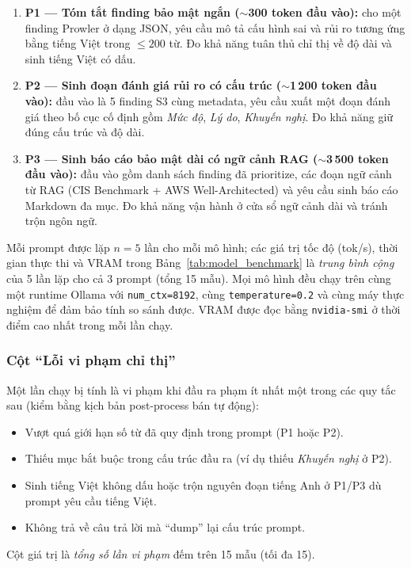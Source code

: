 \begin{enumerate}
  \item \textbf{P1 --- Tóm tắt finding bảo mật ngắn ($\sim$300 token đầu vào):} cho một finding Prowler ở dạng JSON, yêu cầu mô tả cấu hình sai và rủi ro tương ứng bằng tiếng Việt trong $\le 200$ từ. Đo khả năng tuân thủ chỉ thị về độ dài và sinh tiếng Việt có dấu.
  \item \textbf{P2 --- Sinh đoạn đánh giá rủi ro có cấu trúc ($\sim$1\,200 token đầu vào):} đầu vào là 5 finding S3 cùng metadata, yêu cầu xuất một đoạn đánh giá theo bố cục cố định gồm \textit{Mức độ}, \textit{Lý do}, \textit{Khuyến nghị}. Đo khả năng giữ đúng cấu trúc và độ dài.
  \item \textbf{P3 --- Sinh báo cáo bảo mật dài có ngữ cảnh RAG ($\sim$3\,500 token đầu vào):} đầu vào gồm danh sách finding đã prioritize, các đoạn ngữ cảnh từ RAG (CIS Benchmark + AWS Well-Architected) và yêu cầu sinh báo cáo Markdown đa mục. Đo khả năng vận hành ở cửa sổ ngữ cảnh dài và tránh trộn ngôn ngữ.
\end{enumerate}

Mỗi prompt được lặp $n=5$ lần cho mỗi mô hình; các giá trị tốc độ (tok/s), thời gian thực thi và VRAM trong Bảng~\ref{tab:model_benchmark} là \textit{trung bình cộng} của 5 lần lặp cho cả 3 prompt (tổng 15 mẫu). Mọi mô hình đều chạy trên cùng một runtime Ollama với \texttt{num\_ctx=8192}, cùng \texttt{temperature=0.2} và cùng máy thực nghiệm để đảm bảo tính so sánh được. VRAM được đọc bằng \texttt{nvidia-smi} ở thời điểm cao nhất trong mỗi lần chạy.

\subsubsection*{Cột ``Lỗi vi phạm chỉ thị''}
Một lần chạy bị tính là vi phạm khi đầu ra phạm ít nhất một trong các quy tắc sau (kiểm bằng kịch bản post-process bán tự động):
\begin{itemize}
  \item Vượt quá giới hạn số từ đã quy định trong prompt (P1 hoặc P2).
  \item Thiếu mục bắt buộc trong cấu trúc đầu ra (ví dụ thiếu \textit{Khuyến nghị} ở P2).
  \item Sinh tiếng Việt không dấu hoặc trộn nguyên đoạn tiếng Anh ở P1/P3 dù prompt yêu cầu tiếng Việt.
  \item Không trả về câu trả lời mà ``dump'' lại cấu trúc prompt.
\end{itemize}
Cột giá trị là \textit{tổng số lần vi phạm} đếm trên 15 mẫu (tối đa 15).


